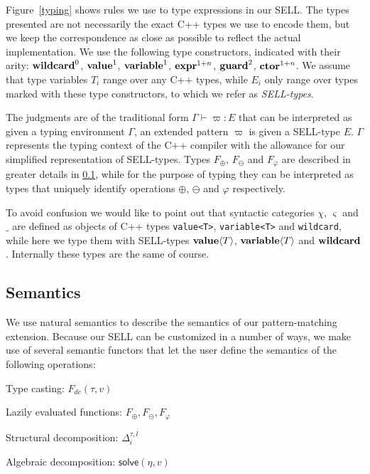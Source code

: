 \documentclass{llncs}
\makeatletter
\DeclareRobustCommand{\code}[1]{{\lstinline[keepspaces,breaklines=false,escapechar=@]{#1}}}
\newcommand{\CWildcard}{\ensuremath{\mathit{\bf wildcard}}}
\newcommand{\CValue}   {\ensuremath{\mathit{\bf value}}}
\newcommand{\CVariable}{\ensuremath{\mathit{\bf variable}}}
\newcommand{\CExpr}    {\ensuremath{\mathit{\bf expr}}}
\newcommand{\CGuard}   {\ensuremath{\mathit{\bf guard}}}
\newcommand{\CCnstr}   {\ensuremath{\mathit{\bf ctor}}}
\newcommand{\Wildcard}   {\ensuremath{\CWildcard}}
\newcommand{\Value}[1]   {\ensuremath{\CValue\langle{#1}\rangle}}
\newcommand{\Variable}[1]{\ensuremath{\CVariable\langle{#1}\rangle}}
\makeatother
\begin{document}
Figure~\ref{typing} shows rules we use to type expressions in our SELL. The 
types presented are not necessarily the exact C++ types we use to encode them, 
but we keep the correspondence as close as possible to reflect the actual 
implementation. We use the following type constructors, indicated with their 
arity: $\CWildcard^0$, $\CValue^1$, $\CVariable^1$, $\CExpr^{1+n}$, $\CGuard^2$, 
$\CCnstr^{1+n}$. We assume that type variables $T_i$ range over any C++ types, 
while $E_i$ only range over types marked with these type constructors, to which 
we refer as \emph{SELL-types}.

The judgments are of the traditional form $\Gamma\vdash \varpi : E$ that can be 
interpreted as given a typing environment $\Gamma$, an extended pattern $\varpi$ is 
given a SELL-type $E$. $\Gamma$ represents the typing context of the C++ 
compiler with the allowance for our simplified representation of SELL-types.
Types $F_\oplus$, $F_\ominus$ and $F_\varphi$ are described in greater details 
in \textsection\ref{sec:sem}, while for the purpose of typing they can be 
interpreted as types that uniquely identify operations $\oplus$, $\ominus$ and 
$\varphi$ respectively.

To avoid confusion we would like to point out that syntactic categories $\chi$, 
$\varsigma$ and $\_$ are defined as objects of C++ types \code{value<T>}, 
\code{variable<T>} and \code{wildcard}, while here we type them with SELL-types 
$\Value{T}$, $\Variable{T}$ and $\Wildcard$. Internally these types are the same 
of course.

\subsection{Semantics}
\label{sec:sem}

We use natural semantics\cite{Kahn87} to describe the semantics of our 
pattern-matching extension. Because our SELL can be customized in a number of 
ways, we make use of several semantic functors that let the user define the 
semantics of the following operations:

\begin{compactitem}
\setlength{\itemsep}{0pt}
\setlength{\parskip}{0pt}
\item Type casting: $F_{dc}(\tau,v)$
\item Lazily evaluated functions: $F_\oplus,F_\ominus,F_\varphi$
\item Structural decomposition: $\Delta_i^{\tau,l}$
\item Algebraic decomposition: $\mathsf{solve}(\eta,v)$
\end{compactitem}
\end{document}
